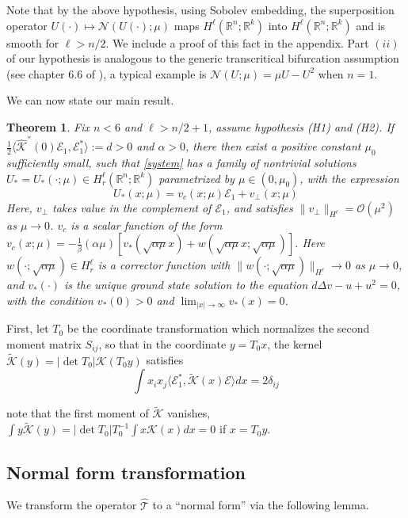\documentclass[letterpaper,11pt]{article}
\newcommand{\R}{\mathbb{R}}
\newcommand{\rmO}{\mathcal{O}}
\newcommand{\Nl}{\mathcal{N}}
\newcommand{\K}{\mathcal{K}}
\numberwithin{equation}{section}
\theoremstyle{plain}
\newtheorem{theorem}{Theorem}[section]
\theoremstyle{remark}
\begin{document}
Note that by the above hypothesis, using Sobolev embedding, the superposition operator $U(\cdot) \mapsto \Nl(U(\cdot);\mu)$ maps $H^\ell(\R^n;\R^k)$ into $H^\ell(\R^n;\R^k)$ and is smooth for $\ell > n/2$. We include a proof of this fact in the appendix. Part $(ii)$ of our hypothesis is analogous to the generic transcritical bifurcation assumption (see chapter 6.6 of \cite{chow1982methods}), a typical example is $\Nl(U;\mu)=\mu U-U^2$ when $n=1$.


We can now state our main result.
 
\begin{theorem}\label{MainRes}Fix $n<6$ and $\ell>n/2+1$, assume hypothesis (H1) and (H2). If $\frac{1}{2}\langle \widehat{\K}^{''}(0)\mathcal{E}_1,\mathcal{E}_1^*\rangle := d>0$ and $\alpha>0$, there then exist a positive constant $\mu_0$ sufficiently small, such that \eqref{system} has a family of nontrivial solutions $U_*=U_*(\cdot;\mu) \in H_r^\ell(\R^n;\R^k)$ parametrized by $\mu\in (0,\mu_0) $, with the expression \begin{equation}\label{expan}
U_*(x;\mu) =  v_c(x;\mu)\mathcal{E}_1 + v_{\perp}(x;\mu)
\end{equation}
Here, $v_{\perp}$ takes value in the complement of $\mathcal{E}_1$, and satisfies $\|v_{\perp}\|_{H^\ell} = \rmO(\mu^2)$ as $\mu \to 0$. $v_c$ is a scalar function of the form 
$v_c(x; \mu)=-\frac{1}{\beta} (\alpha\mu)\left[ v_*(\sqrt{\alpha\mu}x)+w(\sqrt{\alpha\mu}x;\sqrt{\alpha\mu}) \right]$. Here $w(\cdot;\sqrt{\alpha\mu}) \in H^{\ell}_r$ is a corrector function with $\|w(\cdot;\sqrt{\alpha\mu})\|_{H^\ell} \to 0$ as $\mu \to 0$, and $v_*(\cdot)$ is the unique ground state solution to the equation $d\Delta v -u+u^2 =0$, with the condition 
$v_*(0)>0$ and $\lim_{|x|\to \infty}v_*(x)=0$.

\end{theorem}

First, let $T_0$ be the coordinate transformation which normalizes the second moment matrix $S_{ij}$, so that in the coordinate $y = T_0x$, the kernel $\tilde{\K}(y) = |\det T_0|\K(T_0y)$ satisfies
\[
\int x_ix_j\langle \mathcal{E}_1^*, \tilde{\K}(x)\mathcal{E}\rangle dx = 2\delta_{ij}
\]

note that the first moment of $\tilde{\K}$ vanishes, $\int y\tilde{\K}(y) = |\det T_0|T_0^{-1}\int  x\K(x) dx = 0$ if $x = T_0y$. 
\subsection{Normal form transformation}
We transform the operator $\widehat{\mathcal{T}}$ to a ``normal form'' via the following lemma.
\end{document}
